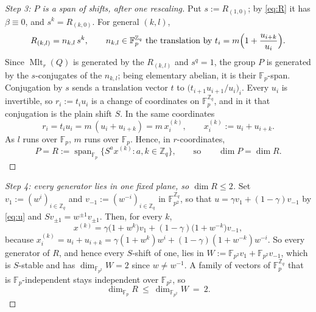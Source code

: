 \documentclass[11pt]{amsart}
\theoremstyle{definition}
\newcommand{\Mltr}{\operatorname{Mlt}_r}
\newcommand{\FF}[1]{\mathbb F_{#1}}
\newcommand{\Zq}{\mathbb Z_q}
\begin{document}
\begin{proof}[Step 3: $P$ is a span of shifts, after one rescaling]
Put $s:=R_{(1,0)}$; by \eqref{eq:R} it has $\beta\equiv0$, and $s^{k}=R_{(k,0)}$.
For general $(k,l)$,
\[
  R_{(k,l)}=n_{k,l}\,s^{k},
  \qquad n_{k,l}\in\FF p^{\Zq}\ \text{the translation by}\
  t_i=m\Bigl(1+\frac{u_{i+k}}{u_i}\Bigr).
\]
Since $\Mltr(Q)$ is generated by the $R_{(k,l)}$ and $s^{q}=1$, the group $P$ is
generated by the $s$-conjugates of the $n_{k,l}$; being elementary abelian, it is
their $\FF p$-span. Conjugation by $s$ sends a translation vector $t$ to
$\bigl(t_{i+1}u_{i+1}/u_i\bigr)_i$. Every $u_i$ is invertible, so
$r_i:=t_iu_i$ is a change of coordinates on $\FF p^{\Zq}$, and in it that
conjugation is the plain shift $S$. In the same coordinates
\[
  r_i=t_iu_i=m\,(u_i+u_{i+k})=m\,x^{(k)}_i,
  \qquad x^{(k)}_i:=u_i+u_{i+k}.
\]
As $l$ runs over $\FF p$, $m$ runs over $\FF p$. Hence, in $r$-coordinates,
\begin{equation}\label{eq:R2}
  P=R:=\operatorname{span}_{\FF p}
      \bigl\{S^{a}x^{(k)}:a,k\in\Zq\bigr\},
  \qquad\text{so}\qquad \dim P=\dim R .
\end{equation}
\end{proof}

\begin{proof}[Step 4: every generator lies in one fixed plane, so $\dim R\le2$]
Set $v_1:=(w^{i})_{i\in\Zq}$ and $v_{-1}:=(w^{-i})_{i\in\Zq}$ in
$\FF{p^{2}}^{\Zq}$, so that $u=\gamma v_1+(1-\gamma)v_{-1}$ by \eqref{eq:u} and
$Sv_{\pm1}=w^{\pm1}v_{\pm1}$. Then, for every $k$,
\begin{equation}\label{eq:key}
  x^{(k)}=\gamma\bigl(1+w^{k}\bigr)v_1+(1-\gamma)\bigl(1+w^{-k}\bigr)v_{-1},
\end{equation}
because $x^{(k)}_i=u_i+u_{i+k}
=\gamma(1+w^{k})w^{i}+(1-\gamma)(1+w^{-k})w^{-i}$. So every generator of $R$,
and hence every $S$-shift of one, lies in
$W:=\FF{p^{2}}v_1+\FF{p^{2}}v_{-1}$, which is $S$-stable and has
$\dim_{\FF{p^{2}}}W=2$ since $w\neq w^{-1}$. A family of vectors of
$\FF p^{\Zq}$ that is $\FF p$-independent stays independent over $\FF{p^{2}}$,
so
\[
  \dim_{\FF p}R\ \le\ \dim_{\FF{p^{2}}}W\ =\ 2 .
\]
\end{proof}
\end{document}
